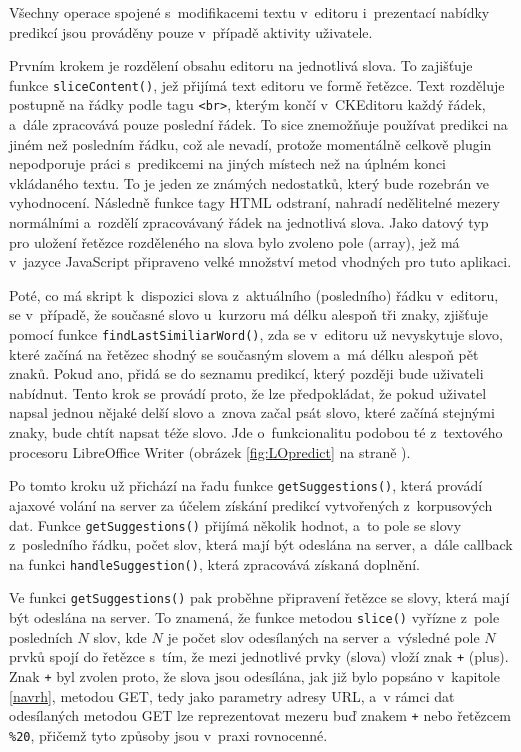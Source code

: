 \documentclass[a4paper,11pt,openany]{book} %
\begin{document}
Všechny operace spojené s~modifikacemi textu v~editoru i~prezentací nabídky predikcí jsou prováděny pouze v~případě aktivity uživatele. 

Prvním krokem je rozdělení obsahu editoru na jednotlivá slova. To zajišťuje funkce {\tt sliceContent()}, jež přijímá text editoru ve formě řetězce. Text rozděluje postupně na řádky podle tagu {\tt <br>}, kterým končí v~CKEditoru každý řádek, a~dále zpracovává pouze poslední řádek. To sice znemožňuje používat predikci na jiném než posledním řádku, což ale nevadí, protože momentálně celkově plugin nepodporuje práci s~predikcemi na jiných místech než na úplném konci vkládaného textu. To je jeden ze známých nedostatků, který bude rozebrán ve vyhodnocení. Následně funkce tagy HTML odstraní, nahradí nedělitelné mezery normálními a~rozdělí zpracovávaný řádek na jednotlivá slova. Jako datový typ pro uložení řetězce rozděleného na slova bylo zvoleno pole (array), jež má v~jazyce JavaScript připraveno velké množství metod vhodných pro tuto aplikaci. 

Poté, co má skript k~dispozici slova z~aktuálního (posledního) řádku v~editoru, se v~případě, že současné slovo u~kurzoru má délku alespoň tři znaky, zjišťuje pomocí funkce {\tt findLastSimiliarWord()}, zda se v~editoru už nevyskytuje slovo, které začíná na řetězec shodný se současným slovem a~má délku alespoň pět znaků. Pokud ano, přidá se do seznamu predikcí, který později bude uživateli nabídnut. Tento krok se provádí proto, že lze předpokládat, že pokud uživatel napsal jednou nějaké delší slovo a~znova začal psát slovo, které začíná stejnými znaky, bude chtít napsat téže slovo. Jde o~funkcionalitu podobou té z~textového procesoru LibreOffice Writer (obrázek \ref{fig:LOpredict} na straně \pageref{fig:LOpredict}).

Po tomto kroku už přichází na řadu funkce {\tt getSuggestions()}, která provádí ajaxové volání na server za účelem získání predikcí vytvořených z~korpusových dat. Funkce {\tt getSuggestions()} přijímá několik hodnot, a~to pole se slovy z~posledního řádku, počet slov, která mají být odeslána na server, a~dále callback na funkci {\tt handleSuggestion()}, která zpracovává získaná doplnění.

Ve funkci {\tt getSuggestions()} pak proběhne připravení řetězce se slovy, která mají být odeslána na server. To znamená, že funkce metodou {\tt slice()} vyřízne z~pole posledních $N$ slov, kde $N$ je počet slov odesílaných na server a~výsledné pole $N$ prvků spojí do řetězce s~tím, že mezi jednotlivé prvky (slova) vloží znak {\tt +} (plus). Znak {\tt +} byl zvolen proto, že slova jsou odesílána, jak již bylo popsáno v~kapitole \ref{navrh}, metodou GET, tedy jako parametry adresy URL, a~v rámci dat odesílaných metodou GET lze reprezentovat mezeru buď znakem {\tt +} nebo řetězcem {\tt \%20}, přičemž tyto způsoby jsou v~praxi rovnocenné.
\end{document}

